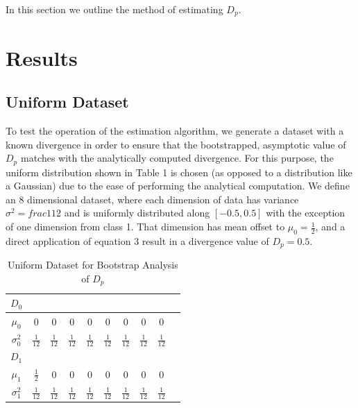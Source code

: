 \documentclass{article}
\begin{document}
	In this section we outline the method of estimating $D_p$.
	
	\section{Results}
	\subsection{\small Uniform Dataset}
	\noindent To test the operation of the estimation algorithm, we generate a dataset with a known divergence in order to ensure that the bootstrapped, asymptotic value of $D_p$ matches with the analytically computed divergence. For this purpose, the uniform distribution shown in Table 1 is chosen (as opposed to a distribution like a Gaussian) due to the ease of performing the analytical computation. We define an 8 dimensional dataset, where each dimension of data has variance $\sigma^2=frac{1}{12}$ and is uniformly distributed along $[-0.5,0.5]$ with the exception of one dimension from class 1. That dimension has mean offset to $\mu_0=\frac{1}{2}$, and a direct application of equation 3 result in a divergence value of $D_p=0.5$.
	
	
	\begin{table}[ht]
		\caption{Uniform Dataset for Bootstrap Analysis of $D_p$}
		\centering %
		\begin{tabular}{c c c c c c c c c c} %
			$D_0$ &  &  &  \\ [0.5ex] %
			\hline %
			$\mu_0$ & 0 & 0 & 0 & 0 & 0 & 0 & 0 & 0\\[0.5ex] %
			$\sigma_0^2$ & \( \frac{1}{12} \) & \( \frac{1}{12} \) & \( \frac{1}{12} \) & \( \frac{1}{12} \) & \( \frac{1}{12} \) & \( \frac{1}{12} \) & \( \frac{1}{12} \) & \( \frac{1}{12} \) &  \\[2ex]
			
			$D_1$ & \\ [0.5ex]
			
			\hline
			$\mu_1$ & \( \frac{1}{2} \) & 0 & 0 & 0 & 0 & 0 & 0 & 0\\[0.5ex] %
			$\sigma_1^2$ & \( \frac{1}{12} \) & \( \frac{1}{12} \) & \( \frac{1}{12} \) & \( \frac{1}{12} \) & \( \frac{1}{12} \) & \( \frac{1}{12} \) & \( \frac{1}{12} \) & \( \frac{1}{12} \) &  \\ [1ex] %
			\hline %
		\end{tabular}
		\label{table:nonlin} %
	\end{table}
	
\end{document}
